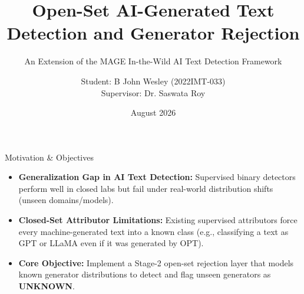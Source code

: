 \documentclass[aspectratio=169]{beamer}
\title[Open-Set AI Generator Detection]{Open-Set AI-Generated Text Detection and Generator Rejection}
\subtitle{An Extension of the MAGE In-the-Wild AI Text Detection Framework}
\author[Wesley]{Student: B John Wesley (2022IMT-033)\\[0.2cm] Supervisor: Dr. Saswata Roy}
\institute[ABV-IIITM]{Atal Bihari Vajpayee Indian Institute of Information Technology and Management, Gwalior}
\date{August 2026}
\begin{document}
\begin{frame}
\titlepage
\end{frame}

\begin{frame}{Motivation \& Objectives}
\begin{itemize}
    \item \textbf{Generalization Gap in AI Text Detection:} Supervised binary detectors perform well in closed labs but fail under real-world distribution shifts (unseen domains/models).
    \item \textbf{Closed-Set Attributor Limitations:} Existing supervised attributors force every machine-generated text into a known class (e.g., classifying a text as GPT or LLaMA even if it was generated by OPT).
    \item \textbf{Core Objective:} Implement a Stage-2 open-set rejection layer that models known generator distributions to detect and flag unseen generators as \textbf{UNKNOWN}.
\end{itemize}
\end{frame}
\end{document}
